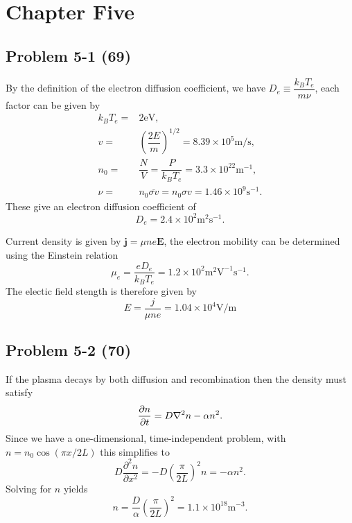 \chapter*{Chapter Five}
\label{ch:Five}

\section*{Problem 5-1 (69)}
\label{sec:5-1}
By the definition of the electron diffusion coefficient, we have \(D_e \equiv \dfrac{k_BT_e}{m\nu} \), each factor can be given by
\begin{align*}
	k_BT_e =& 2\text{eV},\\
	v =& \left(\dfrac{2E}{m}\right)^{1/2} = 8.39 \times 10^5 \text{m/s},\\
	n_0 =& \dfrac{N}{V} = \dfrac{P}{k_BT_e} = 3.3\times 10^{22} \text{m}^{-1}, \\
	\nu =& n_0\overline{\sigma v} = n_0\sigma v = 1.46 \times 10^9\text{s}^{-1}.
\end{align*}
These give an electron diffusion coefficient of
\begin{equation*}
	D_e = 2.4\times10^2\text{m}^2\text{s}^{-1}.
\end{equation*}

Current density is given by \(\bm{j} = \mu n e \bm{E} \), the electron mobility can be determined using the Einstein relation
\begin{equation*}
	\mu_e = \dfrac{eD_e}{k_BT_e} = 1.2\times 10^2 \text{m}^2\text{V}^{-1}\text{s}^{-1}.
\end{equation*}
The electic field stength is therefore given by
\begin{equation*}
	E = \dfrac{j}{\mu ne} = 1.04 \times 10^4 \text{V}/\text{m}
\end{equation*}


\section*{Problem 5-2 (70)}
\label{sec:5-2}
If the plasma decays by both diffusion and recombination then the density must satisfy
\begin{equation*}
	\frac{\partial n}{\partial t} = D\nabla^2n - \alpha n^2.
\end{equation*}
Since we have a one-dimensional, time-independent problem, with \(n = n_0\cos(\pi x/2L)\) this simplifies to
\begin{equation*}
	D\dfrac{\partial^2n}{\partial x^2} = -D\left(\dfrac{\pi}{2L}\right)^2n = -\alpha n^2.
\end{equation*}
Solving for \(n\) yields
\begin{equation*}
	n = \dfrac{D}{\alpha} \left(\dfrac{\pi}{2L}\right)^2 = 1.1\times 10^{18}\text{m}^{-3}.
\end{equation*}